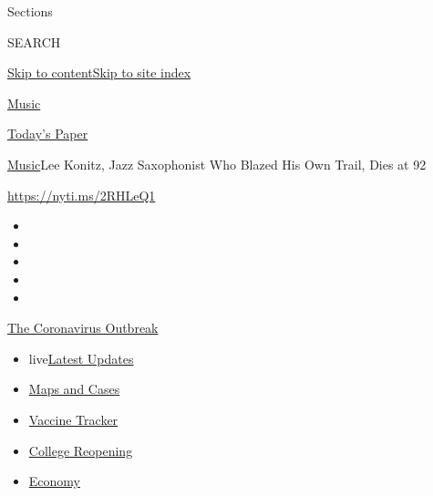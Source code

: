 Sections

SEARCH

\protect\hyperlink{site-content}{Skip to
content}\protect\hyperlink{site-index}{Skip to site index}

\href{https://www.nytimes3xbfgragh.onion/section/arts/music}{Music}

\href{https://myaccount.nytimes3xbfgragh.onion/auth/login?response_type=cookie\&client_id=vi}{}

\href{https://www.nytimes3xbfgragh.onion/section/todayspaper}{Today's
Paper}

\href{/section/arts/music}{Music}\textbar{}Lee Konitz, Jazz Saxophonist
Who Blazed His Own Trail, Dies at 92

\url{https://nyti.ms/2RHLeQ1}

\begin{itemize}
\item
\item
\item
\item
\item
\end{itemize}

\href{https://www.nytimes3xbfgragh.onion/news-event/coronavirus?action=click\&pgtype=Article\&state=default\&region=TOP_BANNER\&context=storylines_menu}{The
Coronavirus Outbreak}

\begin{itemize}
\tightlist
\item
  live\href{https://www.nytimes3xbfgragh.onion/2020/08/04/world/coronavirus-covid-19.html?action=click\&pgtype=Article\&state=default\&region=TOP_BANNER\&context=storylines_menu}{Latest
  Updates}
\item
  \href{https://www.nytimes3xbfgragh.onion/interactive/2020/us/coronavirus-us-cases.html?action=click\&pgtype=Article\&state=default\&region=TOP_BANNER\&context=storylines_menu}{Maps
  and Cases}
\item
  \href{https://www.nytimes3xbfgragh.onion/interactive/2020/science/coronavirus-vaccine-tracker.html?action=click\&pgtype=Article\&state=default\&region=TOP_BANNER\&context=storylines_menu}{Vaccine
  Tracker}
\item
  \href{https://www.nytimes3xbfgragh.onion/2020/08/02/us/covid-college-reopening.html?action=click\&pgtype=Article\&state=default\&region=TOP_BANNER\&context=storylines_menu}{College
  Reopening}
\item
  \href{https://www.nytimes3xbfgragh.onion/live/2020/08/03/business/stock-market-today-coronavirus?action=click\&pgtype=Article\&state=default\&region=TOP_BANNER\&context=storylines_menu}{Economy}
\end{itemize}

